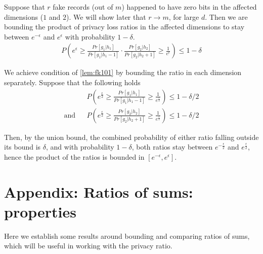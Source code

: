 \documentclass[11pt]{article}
\begin{document}
Suppose that $r$ fake records (out of $m$) happened to have zero bits in the affected dimensions ($1$ and $2$).  We will show later that $r \to m$,  for  large $d$.  Then we are bounding the product of privacy loss ratios in the affected dimensions to stay between $e^{-\epsilon}$ and $e^\epsilon$ with probability $1-\delta$.
\begin{align} \label{lem:fk101}
P \left (   e^\epsilon \ge \frac{  Pr[ g_1 | h_1]  } {  Pr[ g_1 | h_1 - 1]  } \cdot \frac{  Pr[ g_2 | h_2]  } {  Pr[ g_2 | h_2 + 1]  }  \ge \frac{1}{e^\epsilon} \right ) \le 1 - \delta
\end{align}

We achieve condition of \eqref{lem:fk101} by bounding the ratio in each dimension separately.  Suppose that the following holds
\begin{align*} \label{lem:fk101}
&& P \left (   e^\frac{\epsilon}{2} \ge \frac{  Pr[ g_1 | h_1]  } {  Pr[ g_1 | h_1 - 1] }  \ge \frac{1}{e^\frac{\epsilon}{2}} \right ) \le 1 - \delta/2 \\
\text{and} && P \left (   e^\frac{\epsilon}{2} \ge \frac{  Pr[ g_2 | h_2]  } {  Pr[ g_2 | h_2 + 1]  }  \ge \frac{1}{e^\frac{\epsilon}{2}} \right ) \le 1 - \delta/2 
\end{align*}

Then, by the union bound, the combined probability of either ratio falling outside its bound is $\delta$, and with probability $1-\delta$, both ratios stay between $e^{-\frac{\epsilon}{2}}$ and $e^\frac{\epsilon}{2}$, hence the product of the ratios is bounded in $[ e^{-\epsilon}, e^\epsilon]$.   

\begin{prop}
\end{prop}



\section{Appendix: Ratios of sums: properties}

Here we establish some results around bounding and comparing ratios of sums, which will be useful in working with the privacy ratio.
\end{document}
